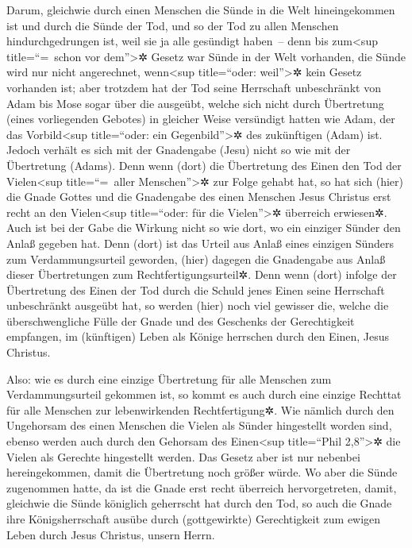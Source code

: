  Darum, gleichwie durch einen Menschen die Sünde in die
Welt hineingekommen ist und durch die Sünde der Tod, und so der Tod zu
allen Menschen hindurchgedrungen ist, weil sie ja alle gesündigt
haben~--  denn bis zum\textless sup title=``=~schon vor
dem''\textgreater✲ Gesetz war Sünde in der Welt vorhanden, die Sünde
wird nur nicht angerechnet, wenn\textless sup title=``oder:
weil''\textgreater✲ kein Gesetz vorhanden ist;  aber
trotzdem hat der Tod seine Herrschaft unbeschränkt von Adam bis Mose
sogar über die ausgeübt, welche sich nicht durch Übertretung (eines
vorliegenden Gebotes) in gleicher Weise versündigt hatten wie Adam, der
das Vorbild\textless sup title=``oder: ein Gegenbild''\textgreater✲ des
zukünftigen (Adam) ist.  Jedoch verhält es sich mit der
Gnadengabe (Jesu) nicht so wie mit der Übertretung (Adams). Denn wenn
(dort) die Übertretung des Einen den Tod der Vielen\textless sup
title=``=~aller Menschen''\textgreater✲ zur Folge gehabt hat, so hat
sich (hier) die Gnade Gottes und die Gnadengabe des einen Menschen Jesus
Christus erst recht an den Vielen\textless sup title=``oder: für die
Vielen''\textgreater✲ überreich erwiesen✲.  Auch ist bei
der Gabe die Wirkung nicht so wie dort, wo ein einziger Sünder den Anlaß
gegeben hat. Denn (dort) ist das Urteil aus Anlaß eines einzigen Sünders
zum Verdammungsurteil geworden, (hier) dagegen die Gnadengabe aus Anlaß
dieser Übertretungen zum Rechtfertigungsurteil✲.  Denn
wenn (dort) infolge der Übertretung des Einen der Tod durch die Schuld
jenes Einen seine Herrschaft unbeschränkt ausgeübt hat, so werden (hier)
noch viel gewisser die, welche die überschwengliche Fülle der Gnade und
des Geschenks der Gerechtigkeit empfangen, im (künftigen) Leben als
Könige herrschen durch den Einen, Jesus Christus.

 Also: wie es durch eine einzige Übertretung für alle
Menschen zum Verdammungsurteil gekommen ist, so kommt es auch durch eine
einzige Rechttat für alle Menschen zur lebenwirkenden Rechtfertigung✲.
 Wie nämlich durch den Ungehorsam des einen Menschen die
Vielen als Sünder hingestellt worden sind, ebenso werden auch durch den
Gehorsam des Einen\textless sup title=``Phil 2,8''\textgreater✲ die
Vielen als Gerechte hingestellt werden.  Das Gesetz aber
ist nur nebenbei hereingekommen, damit die Übertretung noch größer
würde. Wo aber die Sünde zugenommen hatte, da ist die Gnade erst recht
überreich hervorgetreten,  damit, gleichwie die Sünde
königlich geherrscht hat durch den Tod, so auch die Gnade ihre
Königsherrschaft ausübe durch (gottgewirkte) Gerechtigkeit zum ewigen
Leben durch Jesus Christus, unsern Herrn.

